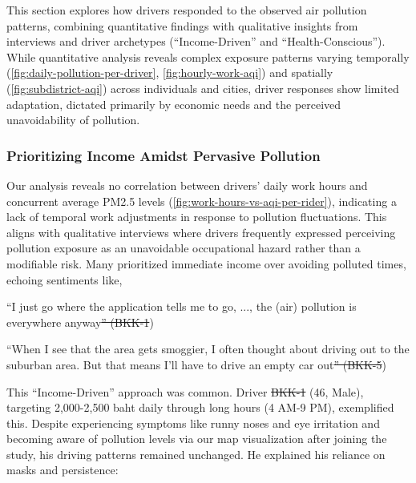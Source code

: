 \documentclass[sigconf,screen,natbib=true]{acmart}
\providecommand{\DIFadd}[1]{{\protect\color{blue}\uwave{#1}}} %
\providecommand{\DIFdel}[1]{{\protect\color{red}\sout{#1}}} %
\providecommand{\DIFaddbegin}{} %
\providecommand{\DIFaddend}{} %
\providecommand{\DIFdelbegin}{} %
\providecommand{\DIFdelend}{} %
\begin{document}
This section explores how drivers responded to the observed air pollution patterns, combining quantitative findings with qualitative insights from interviews and driver archetypes (``Income-Driven'' and ``Health-Conscious'').
While quantitative analysis reveals complex exposure patterns varying temporally (\autoref{fig:daily-pollution-per-driver}, \autoref{fig:hourly-work-aqi}) and spatially (\autoref{fig:subdistrict-aqi}) across individuals and cities,
driver responses show limited adaptation, dictated primarily by economic needs and the perceived unavoidability of pollution.

\subsubsection{Prioritizing Income Amidst Pervasive Pollution}
Our analysis reveals no correlation between drivers' daily work hours and concurrent average PM2.5 levels (\autoref{fig:work-hours-vs-aqi-per-rider}), indicating a lack of temporal work adjustments in response to pollution fluctuations.
This aligns with qualitative interviews where drivers frequently expressed perceiving pollution exposure as an unavoidable occupational hazard rather than a modifiable risk.
Many prioritized immediate income over avoiding polluted times, echoing sentiments like,

\begin{quoteb}
    ``I just go where the application tells me to go, ..., the (air) pollution is everywhere anyway\DIFdelbegin \DIFdel{'' (BKK-1}\DIFdelend \DIFaddbegin \DIFadd{.'' (BKK1}\DIFaddend )
\end{quoteb}

\begin{quoteb}
    ``When I see that the area gets smoggier, I often thought about driving out to the suburban area. But that means I'll have to drive an empty car out\DIFdelbegin \DIFdel{'' (BKK-5}\DIFdelend \DIFaddbegin \DIFadd{.'' (BKK5}\DIFaddend )
\end{quoteb}

This ``Income-Driven'' approach was common.
Driver \DIFdelbegin \DIFdel{BKK-1 }\DIFdelend \DIFaddbegin \DIFadd{BKK1 }\DIFaddend (46, Male), targeting 2,000-2,500 baht daily through long hours (4 AM-9 PM), exemplified this.
Despite experiencing symptoms like runny noses and eye irritation and becoming aware of pollution levels via our map visualization after joining the study, his driving patterns remained unchanged.
He explained his reliance on masks and persistence:
\end{document}
